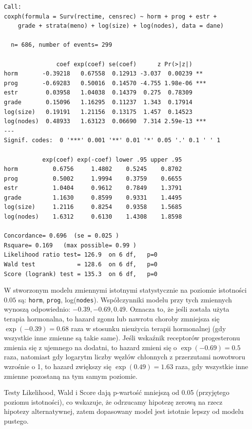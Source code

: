 \documentclass[]{article}
\begin{document}
\begin{verbatim}
Call:
coxph(formula = Surv(rectime, censrec) ~ horm + prog + estr + 
    grade + strata(meno) + log(size) + log(nodes), data = dane)

  n= 686, number of events= 299 

               coef exp(coef) se(coef)      z Pr(>|z|)    
horm       -0.39218   0.67558  0.12913 -3.037  0.00239 ** 
prog       -0.69283   0.50016  0.14570 -4.755 1.98e-06 ***
estr        0.03958   1.04038  0.14379  0.275  0.78309    
grade       0.15096   1.16295  0.11237  1.343  0.17914    
log(size)   0.19191   1.21156  0.13175  1.457  0.14523    
log(nodes)  0.48933   1.63123  0.06690  7.314 2.59e-13 ***
---
Signif. codes:  0 '***' 0.001 '**' 0.01 '*' 0.05 '.' 0.1 ' ' 1

           exp(coef) exp(-coef) lower .95 upper .95
horm          0.6756     1.4802    0.5245    0.8702
prog          0.5002     1.9994    0.3759    0.6655
estr          1.0404     0.9612    0.7849    1.3791
grade         1.1630     0.8599    0.9331    1.4495
log(size)     1.2116     0.8254    0.9358    1.5685
log(nodes)    1.6312     0.6130    1.4308    1.8598

Concordance= 0.696  (se = 0.025 )
Rsquare= 0.169   (max possible= 0.99 )
Likelihood ratio test= 126.9  on 6 df,   p=0
Wald test            = 128.6  on 6 df,   p=0
Score (logrank) test = 135.3  on 6 df,   p=0
\end{verbatim}

W stworzonym modelu zmiennymi istotnymi statystycznie na poziomie
istotności \(0.05\) są: \texttt{horm}, \texttt{prog},
log(\texttt{nodes}). Współczynniki modelu przy tych zmiennych wynoszą
odpowiednio: \(-0.39, -0.69, 0.49\). Oznacza to, że jeśli została użyta
terapia hormonalna, to hazard zgonu lub nawrotu choroby zmniejsza się
\(\exp(-0.39)=0.68\) raza w stosunku nieużycia terapii hormonalnej
(gdy wszystkie inne zmienne są takie same). Jeśli wskaźnik receptorów
progesteronu zmienia się z ujemnego na dodatni, to hazard zmieni się o
\(\exp(-0.69)=0.5\) raza, natomiast gdy logarytm liczby węzłów chłonnych
z przerzutami nowotworu wzrośnie o 1, to hazard zwiększy się
\(\exp(0.49)=1.63\) raza, gdy wszystkie inne zmienne pozostaną na tym samym poziomie.

Testy Likelihood, Wald i Score dają p-wartość mniejszą od 0.05 (przyjętego poziomu istotności), co wskazuje, że odrzucamy hipotezę zerową na rzecz hipotezy alternatywnej, zatem dopasowany model jest istotnie lepszy od modelu pustego. 
\end{document}
